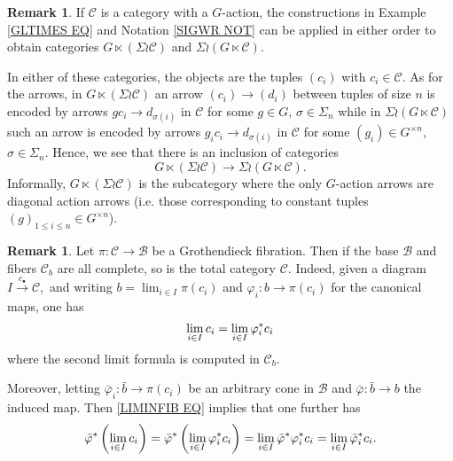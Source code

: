 \documentclass[a4paper,10pt
,draft
]{article}%
\numberwithin{equation}{section}
\numberwithin{figure}{section}
\theoremstyle{definition} %
\newtheorem{remark}[equation]{Remark}%
\newcommand{\C}{\ensuremath{\mathcal C}}
\newcommand{\1}{\ensuremath{\mathbbm 1}}%
\begin{document}
\begin{remark}\label{WRDIAG REM}
If $\mathcal{C}$ is a category with a $G$-action,
the constructions in 
Example \ref{GLTIMES EQ} and Notation \ref{SIGWR NOT}	
can be applied in either order to obtain categories
$G \ltimes (\Sigma \wr \mathcal{C})$
and
$\Sigma \wr (G \ltimes \mathcal{C})$.

In either of these categories, the objects are the tuples
$(c_i)$ with $c_i \in \mathcal{C}$.
%
As for the arrows,
in $G \ltimes (\Sigma \wr \mathcal{C})$
an arrow $(c_i) \to (d_i)$
between tuples of size $n$ is encoded by arrows 
$gc_i \to d_{\sigma(i)}$
in $\C$ for some $g\in G$, $\sigma \in \Sigma_n$
while in $\Sigma \wr (G \ltimes \mathcal{C})$
such an arrow is encoded by arrows
$g_i c_i \to d_{\sigma(i)}$
in $\C$ for some $(g_i) \in G^{\times n}$, $\sigma \in \Sigma_n$.
Hence, we see that there is an inclusion of categories
	\begin{equation} 
	G \ltimes (\Sigma \wr \mathcal C) \to \Sigma \wr (G \ltimes \mathcal C).
	\end{equation}
Informally, $G \ltimes (\Sigma \wr \mathcal C)$
is the subcategory where the only
$G$-action arrows are diagonal action arrows
(i.e. those corresponding to constant tuples $(g)_{1 \leq i \leq n} \in G^{\times n}$).
\end{remark}




\begin{remark}
Let $\pi \colon \mathcal{C} \to \mathcal{B}$ be a Grothendieck fibration.
Then if the base $\mathcal{B}$ and fibers 
$\mathcal{C}_b$
are all complete, so is the total category $\mathcal{C}$.
%
Indeed, given a diagram $I \xrightarrow{c_{\bullet}} \mathcal{C}$,\
and writing
$b = \lim_{i \in I} \pi(c_i)$
and 
$\varphi_i \colon b \to \pi(c_i)$
for the canonical maps,
one has
\begin{equation}\label{LIMINFIB EQ}
\lim_{i \in I} c_i = 
\lim_{i \in I} \varphi_{i}^{\**}c_i
\end{equation}
where the second limit formula is computed in $\mathcal{C}_b$.

Moreover, letting $\bar{\varphi}_i \colon \bar{b} \to \pi(c_i)$
be an arbitrary cone in $\mathcal{B}$
and $\bar{\varphi} \colon \bar{b} \to b$
the induced map.
Then \eqref{LIMINFIB EQ} implies that one further has
\begin{equation}\label{LIMINFIBSUP EQ}
\bar{\varphi}^{\**}\left(\lim_{i \in I} c_i\right) 
	= 
\bar{\varphi}^{\**}\left(\lim_{i \in I} \varphi_{i}^{\**}c_i\right)
	=
\lim_{i \in I} \bar{\varphi}^{\**} \varphi_{i}^{\**}c_i
	=
\lim_{i \in I} \bar{\varphi}_{i}^{\**}c_i.
\end{equation}
\end{remark}
\end{document}
